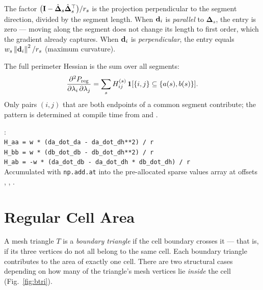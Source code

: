 \documentclass[11pt,a4paper]{article}
\begin{document}
\begin{remark}
The factor $\bigl(\mathbf{I} - \hat{\boldsymbol{\Delta}}_s \hat{\boldsymbol{\Delta}}_s^\top\bigr)/r_s$ is the projection perpendicular to the
segment direction, divided by the segment length.  When $\mathbf{d}_{i}$ is
\emph{parallel} to $\boldsymbol{\Delta}_s$, the entry is zero — moving
along the segment does not change its length to first order, which the
gradient already captures.  When $\mathbf{d}_{i}$ is \emph{perpendicular}, the
entry equals $w_s\left\|\mathbf{d}_{i}\right\|^2/r_s$ (maximum curvature).
\end{remark}

The full perimeter Hessian is the sum over all segments:
\begin{equation}
  \dfrac{\partial^2 P_{\mathrm{reg}}}{\partial \lambda_i\,\partial \lambda_j}
    = \sum_s H^{(s)}_{ij}\,\mathbf{1}[\{i,j\}\subseteq\{a(s),b(s)\}].
  \label{eq:hess-P}
\end{equation}
Only pairs $(i,j)$ that are both endpoints of a common segment contribute;
the pattern is determined at compile time from  and
.

\begin{tcolorbox}[colback=blue!4!white, colframe=blue!40!black,
                  title={Code: perimeter Hessian}, fontupper=\small]
: \\[2pt]
\texttt{H\_aa = w * (da\_dot\_da - da\_dot\_dh**2) / r}\\
\texttt{H\_bb = w * (db\_dot\_db - db\_dot\_dh**2) / r}\\
\texttt{H\_ab = -w * (da\_dot\_db - da\_dot\_dh * db\_dot\_dh) / r}\\
Accumulated with \texttt{np.add.at} into the pre-allocated sparse values
array at offsets , ,
.
\end{tcolorbox}

\section{Regular Cell Area}
\label{sec:area}

A mesh triangle $T$ is a \emph{boundary triangle} if the cell boundary
crosses it — that is, if its three vertices do not all belong to the same
cell.  Each boundary triangle contributes to the area of exactly one cell.
There are two structural cases depending on how many of the triangle's
mesh vertices lie \emph{inside} the cell (Fig.~\ref{fig:btri}).
\end{document}
